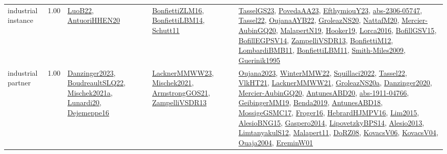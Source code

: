 {\begin{longtable}{p{3cm}r>{\raggedright\arraybackslash}p{6cm}>{\raggedright\arraybackslash}p{6cm}>{\raggedright\arraybackslash}p{8cm}}
\index{industrial instance}\index{Benchmarks!industrial instance}industrial instance &  1.00 & \hyperref[detail:LuoB22]{LuoB22}, \hyperref[detail:AntuoriHHEN20]{AntuoriHHEN20} & \hyperref[detail:BonfiettiZLM16]{BonfiettiZLM16}, \hyperref[detail:BonfiettiLBM14]{BonfiettiLBM14}, \hyperref[detail:Schutt11]{Schutt11} & \hyperref[detail:TasselGS23]{TasselGS23}, \hyperref[detail:PovedaAA23]{PovedaAA23}, \hyperref[detail:EfthymiouY23]{EfthymiouY23}, \hyperref[detail:abs-2306-05747]{abs-2306-05747}, \hyperref[detail:Tassel22]{Tassel22}, \hyperref[detail:OujanaAYB22]{OujanaAYB22}, \hyperref[detail:GroleazNS20]{GroleazNS20}, \hyperref[detail:NattafM20]{NattafM20}, \hyperref[detail:Mercier-AubinGQ20]{Mercier-AubinGQ20}, \hyperref[detail:MalapertN19]{MalapertN19}, \hyperref[detail:Hooker19]{Hooker19}, \hyperref[detail:Lorca2016]{Lorca2016}, \hyperref[detail:BofillGSV15]{BofillGSV15}, \hyperref[detail:BofillEGPSV14]{BofillEGPSV14}, \hyperref[detail:ZampelliVSDR13]{ZampelliVSDR13}, \hyperref[detail:BonfiettiM12]{BonfiettiM12}, \hyperref[detail:LombardiBMB11]{LombardiBMB11}, \hyperref[detail:BonfiettiLBM11]{BonfiettiLBM11}, \hyperref[detail:Smith-Miles2009]{Smith-Miles2009}, \hyperref[detail:Guerinik1995]{Guerinik1995}\\
\index{industrial partner}\index{Benchmarks!industrial partner}industrial partner &  1.00 & \hyperref[detail:Danzinger2023]{Danzinger2023}, \hyperref[detail:BoudreaultSLQ22]{BoudreaultSLQ22}, \hyperref[detail:Mischek2021a]{Mischek2021a}, \hyperref[detail:Lunardi20]{Lunardi20}, \hyperref[detail:Dejemeppe16]{Dejemeppe16} & \hyperref[detail:LacknerMMWW23]{LacknerMMWW23}, \hyperref[detail:Mischek2021]{Mischek2021}, \hyperref[detail:ArmstrongGOS21]{ArmstrongGOS21}, \hyperref[detail:ZampelliVSDR13]{ZampelliVSDR13} & \hyperref[detail:Oujana2023]{Oujana2023}, \hyperref[detail:WinterMMW22]{WinterMMW22}, \hyperref[detail:Squillaci2022]{Squillaci2022}, \hyperref[detail:Tassel22]{Tassel22}, \hyperref[detail:VlkHT21]{VlkHT21}, \hyperref[detail:LacknerMMWW21]{LacknerMMWW21}, \hyperref[detail:GroleazNS20a]{GroleazNS20a}, \hyperref[detail:Danzinger2020]{Danzinger2020}, \hyperref[detail:Mercier-AubinGQ20]{Mercier-AubinGQ20}, \hyperref[detail:AntunesABD20]{AntunesABD20}, \hyperref[detail:abs-1911-04766]{abs-1911-04766}, \hyperref[detail:GeibingerMM19]{GeibingerMM19}, \hyperref[detail:Benda2019]{Benda2019}, \hyperref[detail:AntunesABD18]{AntunesABD18}, \hyperref[detail:MossigeGSMC17]{MossigeGSMC17}, \hyperref[detail:Froger16]{Froger16}, \hyperref[detail:HebrardHJMPV16]{HebrardHJMPV16}, \hyperref[detail:Lim2015]{Lim2015}, \hyperref[detail:AlesioBNG15]{AlesioBNG15}, \hyperref[detail:Gaspero2014]{Gaspero2014}, \hyperref[detail:LipovetzkyBPS14]{LipovetzkyBPS14}, \hyperref[detail:Alesio2013]{Alesio2013}, \hyperref[detail:LimtanyakulS12]{LimtanyakulS12}, \hyperref[detail:Malapert11]{Malapert11}, \hyperref[detail:DoRZ08]{DoRZ08}, \hyperref[detail:KovacsV06]{KovacsV06}, \hyperref[detail:KovacsV04]{KovacsV04}, \hyperref[detail:Ouaja2004]{Ouaja2004}, \hyperref[detail:EreminW01]{EreminW01}\\

\end{longtable}}
